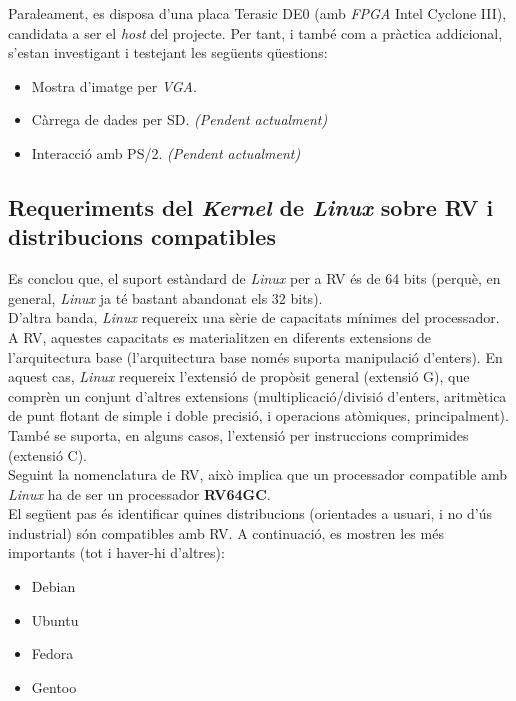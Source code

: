 \documentclass{article}
\begin{document}
Parale\lgem ament, es disposa d'una placa Terasic DE0 (amb \textit{FPGA} Intel Cyclone III), candidata a ser el \textit{host} del projecte. Per tant, i també com a pràctica addicional, s'estan investigant i testejant les següents qüestions:

\begin{itemize}
\item Mostra d'imatge per \textit{VGA}.
\item Càrrega de dades per SD. \textit{(Pendent actualment)}
\item Interacció amb PS/2. \textit{(Pendent actualment)}
\end{itemize}

\subsection{Requeriments del \textit{Kernel} de \textit{Linux} sobre RV i distribucions compatibles}

Es conclou que, el suport estàndard de \textit{Linux} per a RV és de 64 bits (perquè, en general, \textit{Linux} ja té bastant abandonat els 32 bits).\\

D'altra banda, \textit{Linux} requereix una sèrie de capacitats mínimes del processador.
A RV, aquestes capacitats es materialitzen en diferents extensions de l'arquitectura base (l'arquitectura base només suporta manipulació d'enters).
En aquest cas, \textit{Linux} requereix l'extensió de propòsit general (extensió G), que comprèn un conjunt d'altres extensions (multiplicació/divisió d'enters, aritmètica de punt flotant de simple i doble precisió, i operacions atòmiques, principalment).
També se suporta, en alguns casos, l'extensió per instruccions comprimides (extensió C).\\

Seguint la nomenclatura de RV, això implica que un processador compatible amb \textit{Linux} ha de ser un processador \textbf{RV64GC}.\\

El següent pas és identificar quines distribucions (orientades a usuari, i no d'ús industrial) són compatibles amb RV. A continuació, es mostren les més importants (tot i haver-hi d'altres):

\begin{itemize}
\item Debian
\item Ubuntu
\item Fedora
\item Gentoo
\end{itemize}
\end{document}
